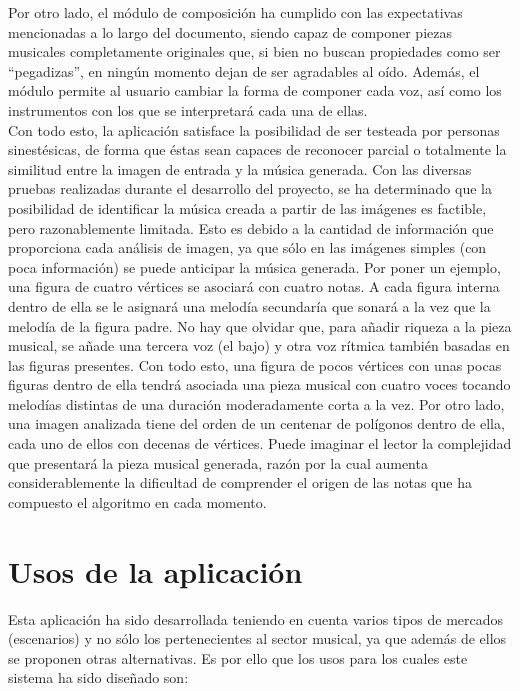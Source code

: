 Por otro lado, el módulo de composición ha cumplido con las expectativas mencionadas a lo largo del documento, siendo capaz de componer piezas musicales completamente originales que, si bien no buscan propiedades como ser ``pegadizas'', en ningún momento dejan de ser agradables al oído. Además, el módulo permite al usuario cambiar la forma de componer cada voz, así como los instrumentos con los que se interpretará cada una de ellas.\\

Con todo esto, la aplicación satisface la posibilidad de ser testeada por personas sinestésicas, de forma que éstas sean capaces de reconocer parcial o totalmente la similitud entre la imagen de entrada y la música generada. Con las diversas pruebas realizadas durante el desarrollo del proyecto, se ha determinado que la posibilidad de identificar la música creada a partir de las imágenes es factible, pero razonablemente limitada. Esto es debido a la cantidad de información que proporciona cada análisis de imagen, ya que sólo en las imágenes simples (con poca información) se puede anticipar la música generada. Por poner un ejemplo, una figura de cuatro vértices se asociará con cuatro notas. A cada figura interna dentro de ella se le asignará una melodía secundaría que sonará a la vez que la melodía de la figura padre. No hay que olvidar que, para añadir riqueza a la pieza musical, se añade una tercera voz (el bajo) y otra voz rítmica también basadas en las figuras presentes. Con todo esto, una figura de pocos vértices con unas pocas figuras dentro de ella tendrá asociada una pieza musical con cuatro voces tocando melodías distintas de una duración moderadamente corta a la vez. Por otro lado, una imagen analizada tiene del orden de un centenar de polígonos dentro de ella, cada uno de ellos con decenas de vértices. Puede imaginar el lector la complejidad que presentará la pieza musical generada, razón por la cual aumenta considerablemente la dificultad de comprender el origen de las notas que ha compuesto el algoritmo en cada momento.\\


\section{Usos de la aplicación}
\label{sec:usos}

Esta aplicación ha sido desarrollada teniendo en cuenta varios tipos de mercados (escenarios) y no sólo los pertenecientes al sector musical, ya que además de ellos se proponen otras alternativas. Es por ello que los usos para los cuales este sistema ha sido diseñado son:

